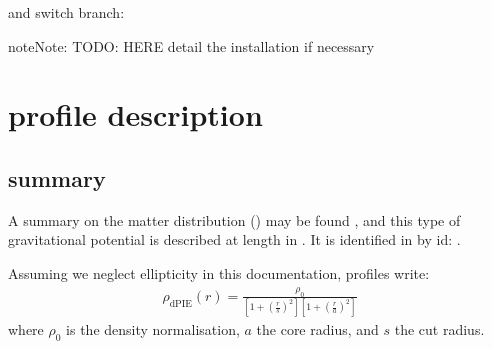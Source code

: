 \documentclass[letterpaper,10pt,english]{sphinxmanual}
\begin{document}
\begin{sphinxVerbatim}[commandchars=\\\{\}]
\end{sphinxVerbatim}

\sphinxAtStartPar
and switch branch:

\begin{sphinxVerbatim}[commandchars=\\\{\}]
\end{sphinxVerbatim}

\begin{sphinxadmonition}{note}{Note:}
\sphinxAtStartPar
TODO: HERE detail the installation if necessary
\end{sphinxadmonition}


\section{ profile description}
\label{\detokenize{usage:idpie-profile-description}}\label{\detokenize{usage::doc}}

\subsection{ summary}
\label{\detokenize{usage:dpie-summary}}\label{\detokenize{usage:id1}}
\sphinxAtStartPar
A summary on the  matter distribution () may be found , and this type of gravitational potential is described at length in 
. It is identified in  by id: .

\sphinxAtStartPar
Assuming we neglect ellipticity in this documentation,  profiles write:
\begin{equation*}
\begin{split}\rho_{\mathrm{dPIE}}(r) = \frac{\rho_0}{\left[ 1 + \left( \frac{r}{s} \right)^2 \right] \left[ 1 + \left( \frac{r}{a} \right)^2 \right]}\end{split}
\end{equation*}
\sphinxAtStartPar
where
\(\rho_0\) is the density normalisation,
\(a\) the core radius, and
\(s\) the cut radius.
\end{document}
